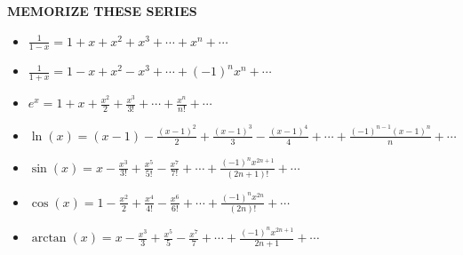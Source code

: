 \documentclass[addpoints, 12pt]{exam}
\begin{document}
\begin{tcolorbox}[black,sharp corners,colback=white,boxrule=.25mm]
    \begin{center}
        \textbf{MEMORIZE THESE SERIES}
    \end{center}
    
    \vspace{.08cm}
    
    \begin{itemize}
    
        \item[] $\displaystyle\frac{1}{1-x}=1+x+x^2+x^3+\cdots+x^n+\cdots$ \vspace{.15in}
        \item[] $\displaystyle\frac{1}{1+x}=1-x+x^2-x^3+\cdots+(-1)^n x^n+\cdots$\vspace{.15in}
        \item[] $\displaystyle e^x=1+x+\frac{x^2}{2}+\frac{x^3}{3!}+\cdots+\frac{x^n}{n!}+\cdots$\vspace{.15in}
        \item[] $\displaystyle \ln(x)=(x-1)-\frac{(x-1)^2}{2}+\frac{(x-1)^3}{3}-\frac{(x-1)^4}{4}+\cdots+\frac{(-1)^{n-1}(x-1)^n}{n}+\cdots$\vspace{.15in}
        \item[] $\displaystyle \sin(x)=x-\frac{x^3}{3!}+\frac{x^5}{5!}-\frac{x^7}{7!}+\cdots+\frac{(-1)^n x^{2n+1}}{(2n+1)!}+\cdots$\vspace{.15in}
        \item[] $\displaystyle \cos(x)=1-\frac{x^2}{2}+\frac{x^4}{4!}-\frac{x^6}{6!}+\cdots+\frac{(-1)^n x^{2n}}{(2n)!}+\cdots$\vspace{.15in}
        \item[] $\displaystyle\arctan(x)=x-\frac{x^3}{3}+\frac{x^5}{5}-\frac{x^7}{7}+\cdots+\frac{(-1)^n x^{2n+1}}{2n+1}+\cdots$\vspace{.15in}
    \end{itemize}
\end{tcolorbox}

\end{document}
